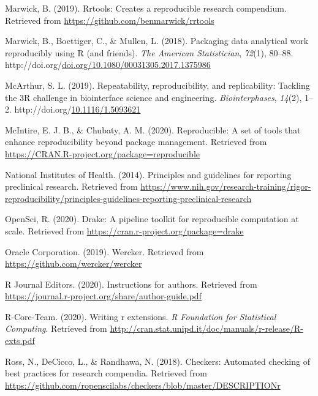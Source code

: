 \documentclass[12pt,twoside]{reedthesis}
\newenvironment{CSLReferences}%
  {}%
  {\par}
\begin{document}
\begin{CSLReferences}{1}{0}
\leavevmode\hypertarget{ref-R-rrtools}{}%
Marwick, B. (2019). Rrtools: Creates a reproducible research compendium. Retrieved from \url{https://github.com/benmarwick/rrtools}

\leavevmode\hypertarget{ref-marwick2018packaging}{}%
Marwick, B., Boettiger, C., \& Mullen, L. (2018). Packaging data analytical work reproducibly using {R} (and friends). \emph{The American Statistician}, \emph{72}(1), 80--88. http://doi.org/\href{https://doi.org/doi.org/10.1080/00031305.2017.1375986}{doi.org/10.1080/00031305.2017.1375986}

\leavevmode\hypertarget{ref-engineering-reproducibility}{}%
McArthur, S. L. (2019). Repeatability, reproducibility, and replicability: Tackling the 3R challenge in biointerface science and engineering. \emph{Biointerphases}, \emph{14}(2), 1--2. http://doi.org/\href{https://doi.org/10.1116/1.5093621}{10.1116/1.5093621}

\leavevmode\hypertarget{ref-R-reproducible}{}%
McIntire, E. J. B., \& Chubaty, A. M. (2020). Reproducible: A set of tools that enhance reproducibility beyond package management. Retrieved from \url{https://CRAN.R-project.org/package=reproducible}

\leavevmode\hypertarget{ref-bio-principles}{}%
National Institutes of Health. (2014). Principles and guidelines for reporting preclinical research. Retrieved from \url{https://www.nih.gov/research-training/rigor-reproducibility/principles-guidelines-reporting-preclinical-research}

\leavevmode\hypertarget{ref-R-drake}{}%
OpenSci, R. (2020). Drake: A pipeline toolkit for reproducible computation at scale. Retrieved from \url{https://cran.r-project.org/package=drake}

\leavevmode\hypertarget{ref-wercker}{}%
Oracle Corporation. (2019). Wercker. Retrieved from \url{https://github.com/wercker/wercker}

\leavevmode\hypertarget{ref-r-journal}{}%
R Journal Editors. (2020). Instructions for authors. Retrieved from \url{https://journal.r-project.org/share/author-guide.pdf}

\leavevmode\hypertarget{ref-coreteam-extensions}{}%
R-Core-Team. (2020). Writing r extensions. \emph{R Foundation for Statistical Computing}. Retrieved from \url{http://cran.stat.unipd.it/doc/manuals/r-release/R-exts.pdf}

\leavevmode\hypertarget{ref-R-checkers}{}%
Ross, N., DeCicco, L., \& Randhawa, N. (2018). Checkers: Automated checking of best practices for research compendia. Retrieved from \url{https://github.com/ropenscilabs/checkers/blob/master/DESCRIPTIONr}


\end{CSLReferences}
\end{document}
